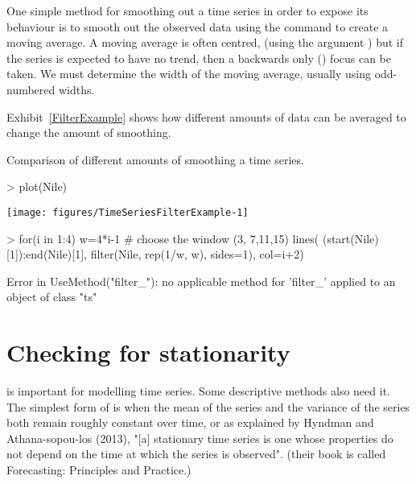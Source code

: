 One simple method for smoothing out a time series in order to expose its behaviour is to smooth out the observed data using  the  command to create a moving average. 
A moving average is often centred, (using the argument ) but if the series is expected to have no trend, then a backwards only ()  focus can be taken. We must determine the width of the moving average, usually using odd-numbered widths. 
 
Exhibit~\ref{FilterExample} shows how different amounts of data can be averaged to change the amount of smoothing. 
\begin{exhibit} 
\begin{center} 
\caption{Comparison of different amounts of smoothing a time series.} 
\label{FilterExample} 

\begin{Schunk}
\begin{Sinput}
> plot(Nile) 
\end{Sinput}

\texttt{[image: figures/TimeSeriesFilterExample-1]} \begin{Sinput}
> for(i in 1:4){ 
   w=4*i-1 # choose the window (3, 7,11,15) 
   lines( (start(Nile)[1]):end(Nile)[1], filter(Nile, rep(1/w, w), sides=1), col=i+2) 
   } 
\end{Sinput}
\begin{Soutput}
Error in UseMethod("filter_"): no applicable method for 'filter_' applied to an object of class "ts"
\end{Soutput}
\end{Schunk}

\end{center} 
\end{exhibit} 
 
\section{Checking for stationarity}\label{Stationarity}  
 
 is important for modelling time series. Some descriptive methods also need it. 
The simplest form of  is when the mean of the series and the variance of the series both remain roughly constant over time, or as explained by Hyndman and Athana-sopou-los (2013), "[a] stationary time series is one whose properties do not depend on the time at which the series is observed". (their book is called Forecasting: Principles and Practice.) 
  
